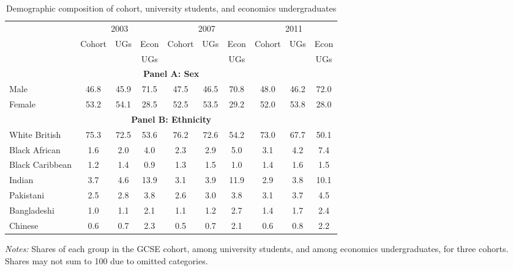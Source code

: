 \begin{table}[htbp]
\centering
\caption{Demographic composition of cohort, university students, and economics undergraduates}
\label{tab:composition}
\begin{tabular}{l ccc ccc ccc}
\toprule
                    & \multicolumn{3}{c}{2003}   & \multicolumn{3}{c}{2007}   & \multicolumn{3}{c}{2011}   \\
\cmidrule(l{3pt}r{3pt}){2-4} \cmidrule(l{3pt}r{3pt}){5-7} \cmidrule(l{3pt}r{3pt}){8-10}
                    & Cohort & UGs  & Econ  & Cohort & UGs  & Econ  & Cohort & UGs  & Econ  \\
                    &        &      & UGs   &        &      & UGs   &        &      & UGs   \\
\midrule
\multicolumn{10}{c}{\textbf{Panel A: Sex}} \\
\midrule
Male                & 46.8   & 45.9 & 71.5  & 47.5   & 46.5 & 70.8  & 48.0   & 46.2 & 72.0  \\
Female              & 53.2   & 54.1 & 28.5  & 52.5   & 53.5 & 29.2  & 52.0   & 53.8 & 28.0  \\
\midrule
\multicolumn{10}{c}{\textbf{Panel B: Ethnicity}} \\
\midrule
White British       & 75.3   & 72.5 & 53.6  & 76.2   & 72.6 & 54.2  & 73.0  & 67.7 & 50.1  \\
Black African       & 1.6  & 2.0 & 4.0 & 2.3  & 2.9 & 5.0 & 3.1  & 4.2 & 7.4 \\
Black Caribbean     & 1.2  & 1.4 & 0.9 & 1.3  & 1.5 & 1.0 & 1.4  & 1.6 & 1.5 \\
Indian              & 3.7  & 4.6 & 13.9 & 3.1  & 3.9 & 11.9 & 2.9  & 3.8 & 10.1 \\
Pakistani           & 2.5  & 2.8 & 3.8 & 2.6  & 3.0 & 3.8 & 3.1  & 3.7 & 4.5 \\
Bangladeshi         & 1.0  & 1.1 & 2.1 & 1.1  & 1.2 & 2.7 & 1.4  & 1.7 & 2.4 \\
Chinese             & 0.6  & 0.7 & 2.3 & 0.5  & 0.7 & 2.1 & 0.6  & 0.8 & 2.2 \\
\bottomrule
\end{tabular}
\begin{minipage}{\textwidth}
\smallskip
\footnotesize
\textit{Notes:} Shares of each group in the GCSE cohort, among university students, and among economics undergraduates, for three cohorts. Shares may not sum to 100 due to omitted categories.
\end{minipage}
\end{table}
